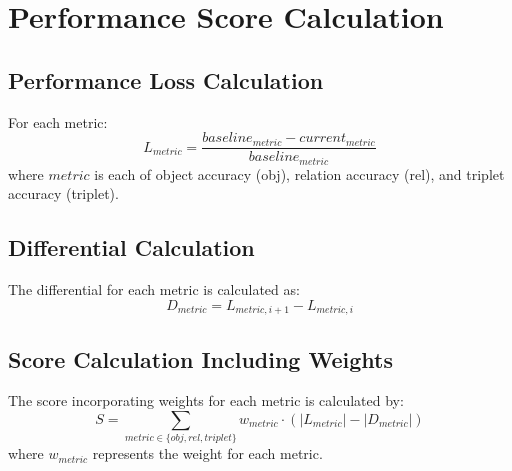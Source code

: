 \documentclass{article}
\begin{document}
\section*{Performance Score Calculation}

\subsection*{Performance Loss Calculation}
For each metric:
\[
L_{metric} = \frac{baseline_{metric} - current_{metric}}{baseline_{metric}}
\]
where \( metric \) is each of object accuracy (obj), relation accuracy (rel), and triplet accuracy (triplet).

\subsection*{Differential Calculation}
The differential for each metric is calculated as:
\[
D_{metric} = L_{metric, i+1} - L_{metric, i}
\]

\subsection*{Score Calculation Including Weights}
The score incorporating weights for each metric is calculated by:
\[
S = \sum_{metric \in \{obj, rel, triplet\}} w_{metric} \cdot (|L_{metric}| - |D_{metric}|)
\]
where \( w_{metric} \) represents the weight for each metric.
\end{document}

